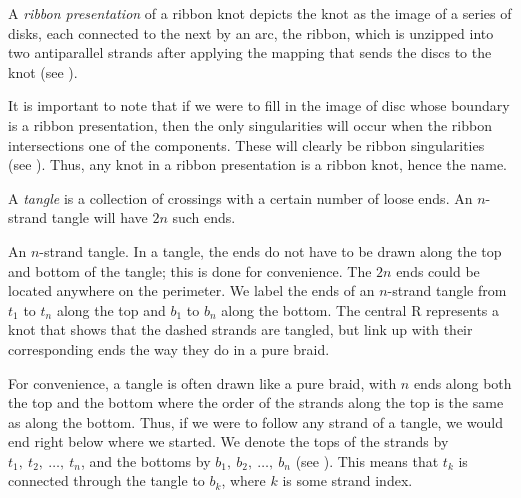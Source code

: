 \begin{paper}
A \textit{ribbon presentation} of a ribbon knot depicts the knot as the image of
a series of disks, each connected to the next by an arc, the ribbon, which is
unzipped into two antiparallel strands after applying the mapping that sends the
discs to the knot (see \figPresentation).

It is important to note that if we were to fill in the image of disc whose
boundary is a ribbon presentation, then the only singularities will occur when
the ribbon intersections one of the components.
These will clearly be ribbon singularities (see \figSingularities).
Thus, any knot in a ribbon presentation is a ribbon knot, hence the name.


A \textit{tangle} is a collection of crossings with a certain number of loose
ends.
An $n$-strand tangle will have $2n$ such ends.

{An $n$-strand tangle.
In a tangle, the ends do not have to be drawn along the top and bottom of the
tangle; this is done for convenience.
The $2n$ ends could be located anywhere on the perimeter.
We label the ends of an $n$-strand tangle from $t_1$ to $t_n$ along the top and
$b_1$ to $b_n$ along the bottom.
The central R represents a knot that shows that the dashed strands are tangled,
but link up with their corresponding ends the way they do in a pure braid.}

For convenience, a tangle is often drawn like a pure braid, with $n$ ends along
both the top and the bottom where the order of the strands along the top is the
same as along the bottom.
Thus, if we were to follow any strand of a tangle, we would end right below
where we started.
We denote the tops of the strands by $t_1,~t_2,~\dots,~t_n$, and the
bottoms  by $b_1,~b_2,~\dots,~b_n$ (see \figTangle).
This means that $t_k$ is connected through the tangle to $b_k$, where $k$ is
some strand index.


\end{paper}
